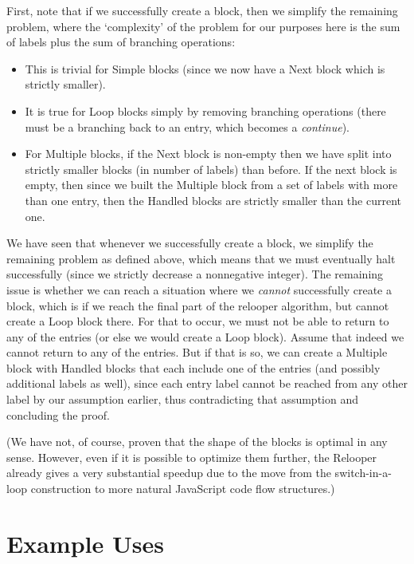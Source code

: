 \documentclass[preprint,10pt]{sigplanconf}
\begin{document}
First, note that if we
successfully create a block, then we simplify the remaining
problem, where the `complexity' of the problem for our purposes
here is the sum of labels plus the sum of branching operations:
\begin{itemize}
\item This is trivial for Simple blocks (since we now have a Next block
which is strictly smaller).
\item It is true for Loop blocks simply by removing branching
operations (there must be a branching back to an entry, which
becomes a \emph{continue}).
\item For Multiple blocks, if the Next block is non-empty then we have split into strictly
smaller blocks (in number of labels) than before. If the next block
is empty, then since we built the Multiple block from a set of labels
with more than one entry, then the Handled blocks are strictly smaller
than the current one.
\end{itemize}
We have seen that whenever we successfully create a block, we simplify the remaining problem
as defined above, which means that we must eventually halt successfully (since
we strictly decrease a nonnegative integer).
The remaining issue is whether we can reach a situation where we \emph{cannot}
successfully create a block, which is if we reach the final part of the relooper algorithm, but cannot create a
Loop block there. For that to occur, we must not be able
to return to any of the entries (or else we would create a Loop
block). Assume that indeed we cannot return to any of the entries. But if that is so, we can create a Multiple
block with Handled blocks that each include one of the entries (and possibly additional labels as well), since each entry
label cannot be reached from any other label by our assumption earlier, thus
contradicting that assumption
and concluding the proof.

(We have not, of course, proven that the shape of the blocks is optimal
in any sense. However, even if it is possible to optimize them further, the Relooper
already gives a very substantial speedup due to the move from the switch-in-a-loop
construction to more natural JavaScript code flow structures.)

\section{Example Uses}
\label{sec:examples}
\end{document}
